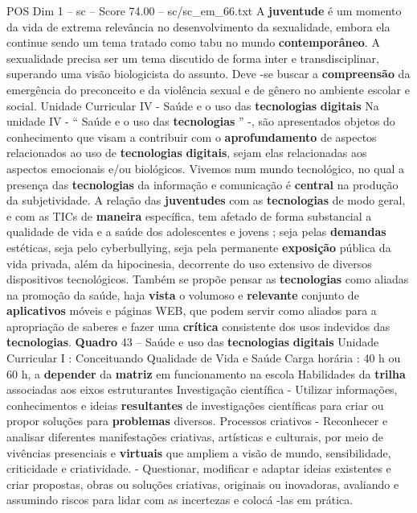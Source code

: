 \begin{textsample}{POS Dim 1 – sc – Score 74.00 – sc/sc\_em\_66.txt}
A \textbf{juventude} é um momento da vida de extrema relevância no desenvolvimento da sexualidade, embora ela continue sendo um tema tratado como tabu no mundo \textbf{contemporâneo}.
A sexualidade precisa ser um tema discutido de forma inter e transdisciplinar, superando uma visão biologicista do assunto.
Deve -se buscar a \textbf{compreensão} da emergência do preconceito e da violência sexual e de gênero no ambiente escolar e social.
Unidade Curricular IV - Saúde e o uso das \textbf{tecnologias} \textbf{digitais} Na unidade IV - “ Saúde e o uso das \textbf{tecnologias} ” -, são apresentados objetos do conhecimento que visam a contribuir com o \textbf{aprofundamento} de aspectos relacionados ao uso de \textbf{tecnologias} \textbf{digitais}, sejam elas relacionadas aos aspectos emocionais e/ou biológicos.
Vivemos num mundo tecnológico, no qual a presença das \textbf{tecnologias} da informação e comunicação é \textbf{central} na produção da subjetividade.
A relação das \textbf{juventudes} com as \textbf{tecnologias} de modo geral, e com as TICs de \textbf{maneira} específica, tem afetado de forma substancial a qualidade de vida e a saúde dos adolescentes e jovens ; seja pelas \textbf{demandas} estéticas, seja pelo cyberbullying, seja pela permanente \textbf{exposição} pública da vida privada, além da hipocinesia, decorrente do uso extensivo de diversos dispositivos tecnológicos.
Também se propõe pensar as \textbf{tecnologias} como aliadas na promoção da saúde, haja \textbf{vista} o volumoso e \textbf{relevante} conjunto de \textbf{aplicativos} móveis e páginas WEB, que podem servir como aliados para a apropriação de saberes e fazer uma \textbf{crítica} consistente dos usos indevidos das \textbf{tecnologias}. \textbf{Quadro} 43 – Saúde e uso das \textbf{tecnologias} \textbf{digitais} Unidade Curricular I : Conceituando Qualidade de Vida e Saúde Carga horária : 40 h ou 60 h, a \textbf{depender} da \textbf{matriz} em funcionamento na escola Habilidades da \textbf{trilha} associadas aos eixos estruturantes Investigação científica - Utilizar informações, conhecimentos e ideias \textbf{resultantes} de investigações científicas para criar ou propor soluções para \textbf{problemas} diversos.
Processos criativos - Reconhecer e analisar diferentes manifestações criativas, artísticas e culturais, por meio de vivências presenciais e \textbf{virtuais} que ampliem a visão de mundo, sensibilidade, criticidade e criatividade. - Questionar, modificar e adaptar ideias existentes e criar propostas, obras ou soluções criativas, originais ou inovadoras, avaliando e assumindo riscos para lidar com as incertezas e colocá -las em prática.

\end{textsample}
